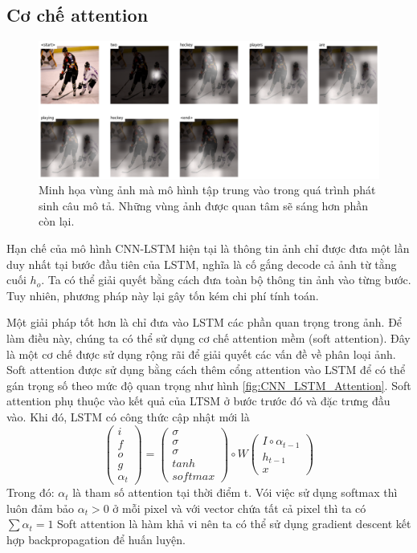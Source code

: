 \documentclass[conference]{IEEEtran}
\begin{document}
\subsection{Cơ chế attention}
\begin{figure}[t]
\centering
\includegraphics[width=\textwidth]{assets/attention.png}
  \caption{Minh họa vùng ảnh mà mô hình tập trung vào trong quá trình phát sinh câu mô tả. Những vùng ảnh được quan tâm sẽ sáng hơn phần còn lại.}
  \label{fig:RNN_LSTM_attention}
\end{figure}

Hạn chế của mô hình CNN-LSTM hiện tại là thông tin ảnh chỉ được đưa một lần duy nhất tại bước đầu tiên của LSTM, nghĩa là cố gắng decode cả ảnh từ tằng cuối $h_o$.
Ta có thể giải quyết bằng cách đưa toàn bộ thông tin ảnh vào từng bước.
Tuy nhiên, phương pháp này lại gây tốn kém chi phí tính toán.

Một giải pháp tốt hơn là chỉ đưa vào LSTM các phần quan trọng trong ảnh. Để làm điều này, chúng ta có thể sử dụng cơ chế attention mềm (soft attention). Đây là một cơ chế được sử dụng rộng rãi  
để giải quyết các vấn đề về phân loại ảnh. Soft attention được sử dụng bằng cách thêm cổng attention vào LSTM để có thể gán trọng số theo mức độ quan trọng như hình \ref{fig:CNN_LSTM_Attention}. Soft attention phụ thuộc vào kết quả của LTSM ở bước trước đó và đặc trưng đầu vào.  Khi đó, LSTM có công thức cập nhật mới là
$$
\begin{pmatrix}
i \\f \\o \\g \\\alpha_t
\end{pmatrix}
= 
\begin{pmatrix}
\sigma \\ \sigma \\ \sigma \\ tanh \\ softmax
\end{pmatrix}
\circ
W
\begin{pmatrix}
I \circ \alpha_{t-1} \\ h_{t-1} \\ x
\end{pmatrix}
$$
Trong đó: $\alpha_t$ là tham số attention tại thời điểm t. Vói việc sử dụng softmax thì luôn đảm bảo $\alpha_t>0$ ở mỗi pixel và với vector chứa tất cả pixel thì ta có $\sum{}{}\alpha_t=1$ Soft attention là hàm khả vi nên ta có thể sử dụng gradient descent kết hợp backpropagation để huấn luyện. 
\end{document}
